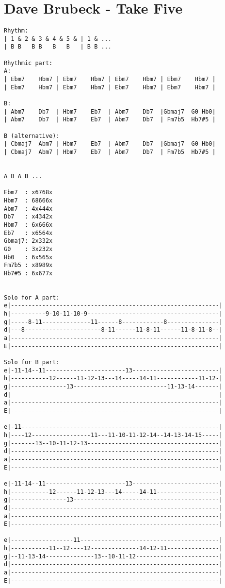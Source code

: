 \section{Dave Brubeck - Take Five}
\begin{verbatim}
Rhythm:
| 1 & 2 & 3 & 4 & 5 & | 1 & ...
| B B   B B   B   B   | B B ...

Rhythmic part:
A:
| Ebm7    Hbm7 | Ebm7    Hbm7 | Ebm7    Hbm7 | Ebm7    Hbm7 |
| Ebm7    Hbm7 | Ebm7    Hbm7 | Ebm7    Hbm7 | Ebm7    Hbm7 |

B:
| Abm7    Db7  | Hbm7    Eb7  | Abm7    Db7  |Gbmaj7  G0 Hb0|
| Abm7    Db7  | Hbm7    Eb7  | Abm7    Db7  | Fm7b5  Hb7#5 |

B (alternative):
| Cbmaj7  Abm7 | Hbm7    Eb7  | Abm7    Db7  |Gbmaj7  G0 Hb0|
| Cbmaj7  Abm7 | Hbm7    Eb7  | Abm7    Db7  | Fm7b5  Hb7#5 |


A B A B ...

Ebm7  : x6768x
Hbm7  : 68666x
Abm7  : 4x444x
Db7   : x4342x
Hbm7  : 6x666x
Eb7   : x6564x
Gbmaj7: 2x332x
G0    : 3x232x
Hb0   : 6x565x
Fm7b5 : x8989x
Hb7#5 : 6x677x


Solo for A part:
e|------------------------------------------------------------|
h|----------9-10-11-10-9--------------------------------------|
g|-----8-11--------------11------8------------8---------------|
d|---8----------------------8-11------11-8-11------11-8-11-8--|
a|------------------------------------------------------------|
E|------------------------------------------------------------|

Solo for B part:
e|-11-14--11-----------------------13-------------------------|
h|-----------12------11-12-13---14-----14-11------------11-12-|
g|----------------13---------------------------11-13-14-------|
d|------------------------------------------------------------|
a|------------------------------------------------------------|
E|------------------------------------------------------------|

e|-11---------------------------------------------------------|
h|----12-----------------11---11-10-11-12-14--14-13-14-15-----|
g|-------13--10-11-12-13--------------------------------------|
d|------------------------------------------------------------|
a|------------------------------------------------------------|
E|------------------------------------------------------------|

e|-11-14--11-----------------------13-------------------------|
h|-----------12------11-12-13---14-----14-11------------------|
g|----------------13------------------------------------------|
d|------------------------------------------------------------|
a|------------------------------------------------------------|
E|------------------------------------------------------------|

e|------------------11----------------------------------------|
h|-----------11--12----12--------------14-12-11---------------|
g|--11-13-14--------------13--10-11-12------------------------|
d|------------------------------------------------------------|
a|------------------------------------------------------------|
E|------------------------------------------------------------|

\end{verbatim}
\newpage



